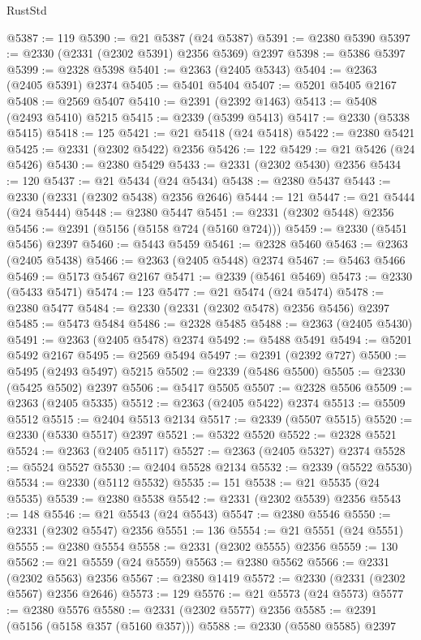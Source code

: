 \begin{lexlean}{RustStd}
\begin{coremodule}
@5387 := 119
@5390 := @21 @5387 (@24 @5387)
@5391 := @2380 @5390
@5397 := @2330 (@2331 (@2302 @5391) @2356 @5369) @2397
@5398 := @5386 @5397
@5399 := @2328 @5398
@5401 := @2363 (@2405 @5343)
@5404 := @2363 (@2405 @5391) @2374
@5405 := @5401 @5404
@5407 := @5201 @5405 @2167
@5408 := @2569 @5407
@5410 := @2391 (@2392 @1463)
@5413 := @5408 (@2493 @5410) @5215
@5415 := @2339 (@5399 @5413)
@5417 := @2330 (@5338 @5415)
@5418 := 125
@5421 := @21 @5418 (@24 @5418)
@5422 := @2380 @5421
@5425 := @2331 (@2302 @5422) @2356
@5426 := 122
@5429 := @21 @5426 (@24 @5426)
@5430 := @2380 @5429
@5433 := @2331 (@2302 @5430) @2356
@5434 := 120
@5437 := @21 @5434 (@24 @5434)
@5438 := @2380 @5437
@5443 := @2330 (@2331 (@2302 @5438) @2356 @2646)
@5444 := 121
@5447 := @21 @5444 (@24 @5444)
@5448 := @2380 @5447
@5451 := @2331 (@2302 @5448) @2356
@5456 := @2391 (@5156 (@5158 @724 (@5160 @724)))
@5459 := @2330 (@5451 @5456) @2397
@5460 := @5443 @5459
@5461 := @2328 @5460
@5463 := @2363 (@2405 @5438)
@5466 := @2363 (@2405 @5448) @2374
@5467 := @5463 @5466
@5469 := @5173 @5467 @2167
@5471 := @2339 (@5461 @5469)
@5473 := @2330 (@5433 @5471)
@5474 := 123
@5477 := @21 @5474 (@24 @5474)
@5478 := @2380 @5477
@5484 := @2330 (@2331 (@2302 @5478) @2356 @5456) @2397
@5485 := @5473 @5484
@5486 := @2328 @5485
@5488 := @2363 (@2405 @5430)
@5491 := @2363 (@2405 @5478) @2374
@5492 := @5488 @5491
@5494 := @5201 @5492 @2167
@5495 := @2569 @5494
@5497 := @2391 (@2392 @727)
@5500 := @5495 (@2493 @5497) @5215
@5502 := @2339 (@5486 @5500)
@5505 := @2330 (@5425 @5502) @2397
@5506 := @5417 @5505
@5507 := @2328 @5506
@5509 := @2363 (@2405 @5335)
@5512 := @2363 (@2405 @5422) @2374
@5513 := @5509 @5512
@5515 := @2404 @5513 @2134
@5517 := @2339 (@5507 @5515)
@5520 := @2330 (@5330 @5517) @2397
@5521 := @5322 @5520
@5522 := @2328 @5521
@5524 := @2363 (@2405 @5117)
@5527 := @2363 (@2405 @5327) @2374
@5528 := @5524 @5527
@5530 := @2404 @5528 @2134
@5532 := @2339 (@5522 @5530)
@5534 := @2330 (@5112 @5532)
@5535 := 151
@5538 := @21 @5535 (@24 @5535)
@5539 := @2380 @5538
@5542 := @2331 (@2302 @5539) @2356
@5543 := 148
@5546 := @21 @5543 (@24 @5543)
@5547 := @2380 @5546
@5550 := @2331 (@2302 @5547) @2356
@5551 := 136
@5554 := @21 @5551 (@24 @5551)
@5555 := @2380 @5554
@5558 := @2331 (@2302 @5555) @2356
@5559 := 130
@5562 := @21 @5559 (@24 @5559)
@5563 := @2380 @5562
@5566 := @2331 (@2302 @5563) @2356
@5567 := @2380 @1419
@5572 := @2330 (@2331 (@2302 @5567) @2356 @2646)
@5573 := 129
@5576 := @21 @5573 (@24 @5573)
@5577 := @2380 @5576
@5580 := @2331 (@2302 @5577) @2356
@5585 := @2391 (@5156 (@5158 @357 (@5160 @357)))
@5588 := @2330 (@5580 @5585) @2397

\end{coremodule}
\end{lexlean}

